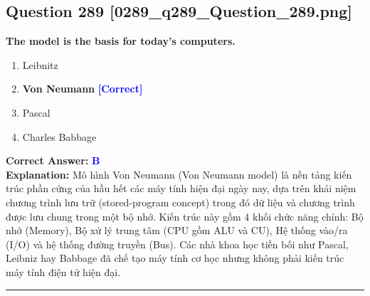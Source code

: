 \documentclass[11pt,a4paper]{article}
\begin{document}
\begin{minipage}{\textwidth}
\subsection*{Question 289 \quad \footnotesize{[0289\_q289\_Question\_289.png]}}
\noindent \textbf{The model is the basis for today's computers.}

\begin{enumerate}[label=\Alph*.]
    \item Leibnitz
    \item \textbf{Von Neumann} \hfill \textcolor{blue}{\textbf{[Correct]}}
    \item Pascal
    \item Charles Babbage
\end{enumerate}

\noindent \textbf{Correct Answer:} \textcolor{blue}{\textbf{B}} \\[2pt]
\noindent \textbf{Explanation:} Mô hình Von Neumann (Von Neumann model) là nền tảng kiến trúc phần cứng của hầu hết các máy tính hiện đại ngày nay, dựa trên khái niệm chương trình lưu trữ (stored-program concept) trong đó dữ liệu và chương trình được lưu chung trong một bộ nhớ. Kiến trúc này gồm 4 khối chức năng chính: Bộ nhớ (Memory), Bộ xử lý trung tâm (CPU gồm ALU và CU), Hệ thống vào/ra (I/O) và hệ thống đường truyền (Bus). Các nhà khoa học tiền bối như Pascal, Leibniz hay Babbage đã chế tạo máy tính cơ học nhưng không phải kiến trúc máy tính điện tử hiện đại.

\par\vspace{0.3cm}
\hrule
\vspace{0.3cm}
\end{minipage}
\end{document}
